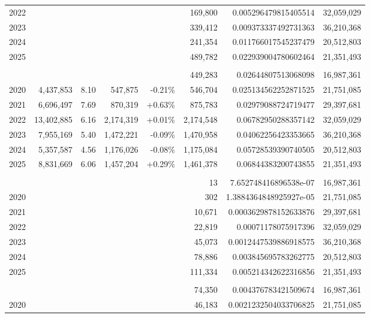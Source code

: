 \begin{table}[!t]
\begin{tabular*}{\linewidth}{@{\extracolsep{\fill}}l|rrrrrrr}
2022 &  &  &  &  & 169,800 & 0.005296479815405514 & 32,059,029 \\
2023 &  &  &  &  & 339,412 & 0.009373337492731363 & 36,210,368 \\
2024 &  &  &  &  & 241,354 & 0.011766017545237479 & 20,512,803 \\
2025 &  &  &  &  & 489,782 & 0.022939004780602464 & 21,351,493 \\
\midrule\addlinespace[2.5pt]
\multicolumn{8}{l}{Google} \\[2.5pt] 
\midrule\addlinespace[2.5pt]
2019 &  &  &  &  & 449,283 & 0.02644807513068098 & 16,987,361 \\
2020 & 4,437,853 & 8.10 & 547,875 & -0.21\% & 546,704 & 0.025134562252871525 & 21,751,085 \\
2021 & 6,696,497 & 7.69 & 870,319 & +0.63\% & 875,783 & 0.02979088724719477 & 29,397,681 \\
2022 & 13,402,885 & 6.16 & 2,174,319 & +0.01\% & 2,174,548 & 0.06782950288357142 & 32,059,029 \\
2023 & 7,955,169 & 5.40 & 1,472,221 & -0.09\% & 1,470,958 & 0.04062256423353665 & 36,210,368 \\
2024 & 5,357,587 & 4.56 & 1,176,026 & -0.08\% & 1,175,084 & 0.05728539390740505 & 20,512,803 \\
2025 & 8,831,669 & 6.06 & 1,457,204 & +0.29\% & 1,461,378 & 0.06844383200743855 & 21,351,493 \\
\midrule\addlinespace[2.5pt]
\multicolumn{8}{l}{Grindr} \\[2.5pt] 
\midrule\addlinespace[2.5pt]
2019 &  &  &  &  & 13 & 7.652748416896538e-07 & 16,987,361 \\
2020 &  &  &  &  & 302 & 1.3884364848925927e-05 & 21,751,085 \\
2021 &  &  &  &  & 10,671 & 0.0003629878152633876 & 29,397,681 \\
2022 &  &  &  &  & 22,819 & 0.00071178075917396 & 32,059,029 \\
2023 &  &  &  &  & 45,073 & 0.0012447539886918575 & 36,210,368 \\
2024 &  &  &  &  & 78,886 & 0.003845695783262775 & 20,512,803 \\
2025 &  &  &  &  & 111,334 & 0.005214342622316856 & 21,351,493 \\
\midrule\addlinespace[2.5pt]
\multicolumn{8}{l}{MediaLab} \\[2.5pt] 
\midrule\addlinespace[2.5pt]
2019 &  &  &  &  & 74,350 & 0.004376783421509674 & 16,987,361 \\
2020 &  &  &  &  & 46,183 & 0.0021232504033706825 & 21,751,085 \\

\end{tabular*}
\end{table}
